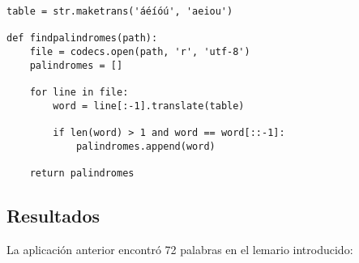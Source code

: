 \documentclass[10pt,a4paper]{article}
\begin{document}
	\begin{Verbatim}
table = str.maketrans('áéíóú', 'aeiou')

def findpalindromes(path):
    file = codecs.open(path, 'r', 'utf-8')
    palindromes = []

    for line in file:
        word = line[:-1].translate(table)

        if len(word) > 1 and word == word[::-1]:
            palindromes.append(word)

    return palindromes
	\end{Verbatim}
	
	\subsection{Resultados}
	
	\noindent
	La aplicación anterior encontró 72 palabras en el lemario introducido:
	
\end{document}
